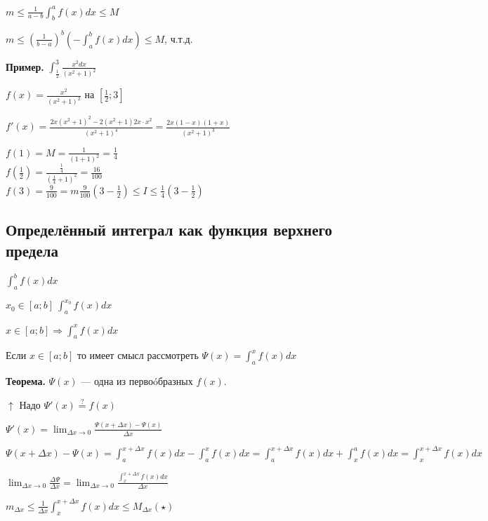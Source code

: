 \documentclass{article}
\begin{document}
\begin{enumerate}
\begin{enumerate}
        \(m \leq \frac{1}{a-b}\int_b^a f(x)dx \leq M\)

        \(m \leq (\frac{1}{b-a})^b(-\int_a^b f(x)dx) \leq M\), ч.т.д.
    \end{enumerate}
    
    \textbf{Пример.}
    \( \int_{\frac 1 2}^{3} \frac{x^2dx}{(x^2+1)^2} \)

    \( f(x) = \frac{x^2}{(x^2+1)^2} \) на $[\frac{1}{2}; 3]$
    
    \(f'(x) = \frac{2x(x^2+1)^2-2(x^2+1)2x\cdot x^2}{(x^2+1)^4} = \frac{2x(1-x)(1+x)}{(x^2 + 1)^3}\)

    \( f(1) = M = \frac{1}{(1+1)^2} = \frac{1}{4} \)\\
    \( f(\frac 1 2) = \frac{\frac 1 4}{(\frac 1 4 + 1)^2} = \frac{16}{100}\)\\
    \( f(3) = \frac{9}{100} = m \frac{9}{100} (3 - \frac{1}{2}) \leq I \leq \frac{1}{4}(3 - \frac{1}{2})\)
    
\end{enumerate}

\subsection{Определённый интеграл как функция верхнего предела}


\(\int_a^b f(x)dx\)

\( x_0 \in [a;b]\ \int_a^{x_0} f(x)dx \)

\( x \in [a;b] \Rightarrow \int_a^x f(x)dx\)

Если $x \in [a; b]$ то имеет смысл рассмотреть \( \Psi(x) = \int_a^xf(x)dx\)

\textbf{Теорема.} \(\Psi(x)\) --- одна из первоóбразных \(f(x)\).

\(\uparrow\) Надо \(\Psi'(x) \overset ? = f(x)\)

\(\Psi'(x) = \lim_{\Delta x \to 0} \frac{\Psi(x+\Delta x) - \Psi(x)}{\Delta x}\)

\(\Psi(x + \Delta x) - \Psi(x) = \int_{a}^{x + \Delta x}f(x)dx - \int_{a}^{x}f(x)dx = \int_a^{x+\Delta x} f(x)dx + \int_x^a f(x)dx = \int_{x}^{x + \Delta x}f(x)dx\)

\(\lim_{\Delta x \to 0} \frac{\Delta \Psi}{\Delta x} = \lim_{\Delta x \to 0} \frac{\int_{x}^{x + \Delta x}f(x)dx}{\Delta x}\)

\(m_{\Delta x} \leq \frac{1}{\Delta x} \int_x^{x+\Delta x} f(x)dx \leq M_{\Delta x} (\star)\)
\end{document}
